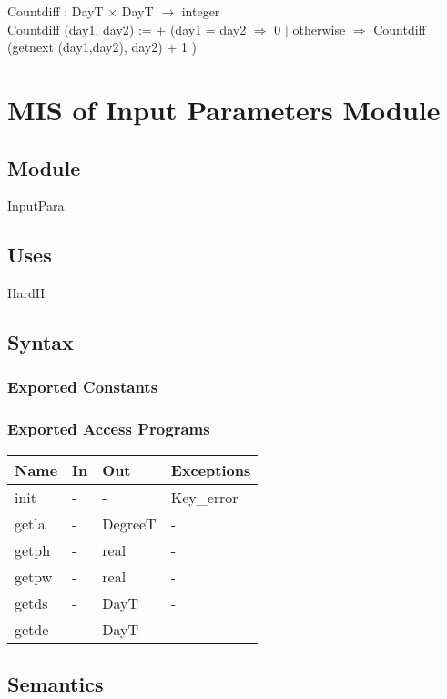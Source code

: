 \documentclass[12pt, titlepage]{article}
\begin{document}
Countdiff : DayT $\times$ DayT $\rightarrow $ integer\\
Countdiff (day1, day2) := + (day1 = day2 $\Rightarrow$ 0 $|$ otherwise $\Rightarrow$ Countdiff (getnext (day1,day2), day2) + 1 )


\section{MIS of Input Parameters Module} \label{ModuleIP} 

\subsection{Module}
InputPara

\subsection{Uses}
HardH

\subsection{Syntax}

\subsubsection{Exported Constants}


\subsubsection{Exported Access Programs}

\begin{center}
\begin{tabular}{p{2cm} p{4cm} p{4cm} p{2cm}}
\hline
\textbf{Name} & \textbf{In} & \textbf{Out} & \textbf{Exceptions} \\
\hline 
init & - & - & Key\_error \\
getla & - & DegreeT & - \\
getph & - & real & - \\
getpw & - & real & - \\
getds & - & DayT & - \\
getde & - & DayT & - \\


\hline
\end{tabular}
\end{center}


\subsection{Semantics}
\end{document}
